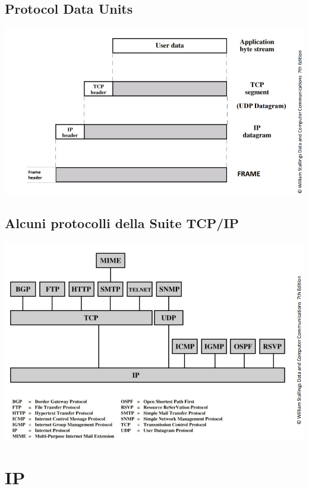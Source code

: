 \documentclass[10pt]{article}
\begin{document}
\subsection{Protocol Data Units}
\begin{center}
\includegraphics[scale=0.715]{livelloretepdu.png}
\end{center}
\subsection{Alcuni protocolli della Suite TCP/IP}
\begin{center}
\includegraphics[scale=0.75]{livelloreteprotocols.png}
\end{center}
\pagebreak
\section{IP}
\end{document}
